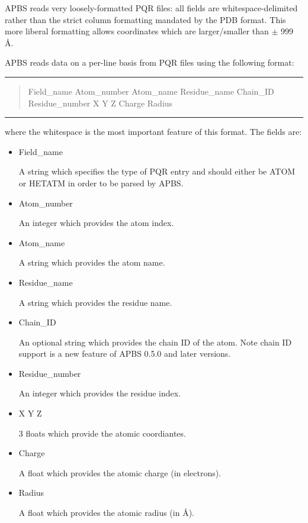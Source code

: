 \documentclass[letterpaper,10pt,english]{sphinxmanual}
\begin{document}
APBS reads very loosely-formatted PQR files: all fields are whitespace-delimited
rather than the strict column formatting mandated by the PDB format. This more
liberal formatting allows coordinates which are larger/smaller than \(\pm\) 999 Å.

APBS reads data on a per-line basis from PQR files using the following format:


\bigskip\hrule{}\bigskip

\begin{quote}

Field\_name Atom\_number Atom\_name Residue\_name Chain\_ID Residue\_number X Y Z Charge Radius
\end{quote}


\bigskip\hrule{}\bigskip


where the whitespace is the most important feature of this format. The fields are:
\begin{itemize}
\item {} 
Field\_name

A string which specifies the type of PQR entry and should either be ATOM or HETATM in order to be parsed by APBS.

\item {} 
Atom\_number

An integer which provides the atom index.

\item {} 
Atom\_name

A string which provides the atom name.

\item {} 
Residue\_name

A string which provides the residue name.

\item {} 
Chain\_ID

An optional string which provides the chain ID of the atom. Note chain ID support is a new feature of APBS 0.5.0 and later versions.

\item {} 
Residue\_number

An integer which provides the residue index.

\item {} 
X Y Z

3 floats which provide the atomic coordiantes.

\item {} 
Charge

A float which provides the atomic charge (in electrons).

\item {} 
Radius

A float which provides the atomic radius (in Å).

\end{itemize}
\end{document}
